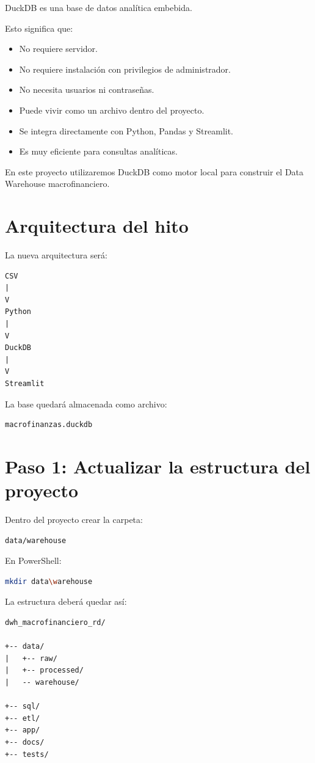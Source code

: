 DuckDB es una base de datos analítica embebida.

Esto significa que:

\begin{itemize}
\item No requiere servidor.
\item No requiere instalación con privilegios de administrador.
\item No necesita usuarios ni contraseñas.
\item Puede vivir como un archivo dentro del proyecto.
\item Se integra directamente con Python, Pandas y Streamlit.
\item Es muy eficiente para consultas analíticas.
\end{itemize}

En este proyecto utilizaremos DuckDB como motor local para construir el Data Warehouse macrofinanciero.

\section{Arquitectura del hito}

La nueva arquitectura será:

\begin{verbatim}
CSV
|
V
Python
|
V
DuckDB
|
V
Streamlit
\end{verbatim}

La base quedará almacenada como archivo:

\begin{verbatim}
macrofinanzas.duckdb
\end{verbatim}

\section{Paso 1: Actualizar la estructura del proyecto}

Dentro del proyecto crear la carpeta:

\begin{verbatim}
data/warehouse
\end{verbatim}

En PowerShell:

\begin{lstlisting}[language=bash]
mkdir data\warehouse
\end{lstlisting}

La estructura deberá quedar así:

\begin{verbatim}
dwh_macrofinanciero_rd/

+-- data/
|   +-- raw/
|   +-- processed/
|   -- warehouse/

+-- sql/
+-- etl/
+-- app/
+-- docs/
+-- tests/
\end{verbatim}

